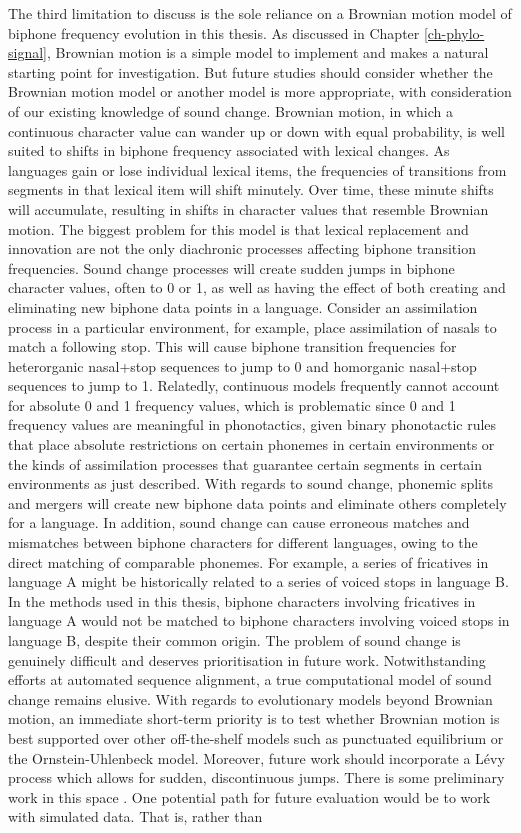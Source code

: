 The third limitation to discuss is the sole reliance on a Brownian motion model of biphone frequency evolution in this thesis. As discussed in Chapter \ref{ch-phylo-signal}, Brownian motion is a simple model to implement and makes a natural starting point for investigation. But future studies should consider whether the Brownian motion model or another model is more appropriate, with consideration of our existing knowledge of sound change. Brownian motion, in which a continuous character value can wander up or down with equal probability, is well suited to shifts in biphone frequency associated with lexical changes. As languages gain or lose individual lexical items, the frequencies of transitions from segments in that lexical item will shift minutely. Over time, these minute shifts will accumulate, resulting in shifts in character values that resemble Brownian motion. The biggest problem for this model is that lexical replacement and innovation are not the only diachronic processes affecting biphone transition frequencies. Sound change processes will create sudden jumps in biphone character values, often to 0 or 1, as well as having the effect of both creating and eliminating new biphone data points in a language. Consider an assimilation process in a particular environment, for example, place assimilation of nasals to match a following stop. This will cause biphone transition frequencies for heterorganic nasal+stop sequences to jump to 0 and homorganic nasal+stop sequences to jump to 1. Relatedly, continuous models frequently cannot account for absolute 0 and 1 frequency values, which is problematic since 0 and 1 frequency values are meaningful in phonotactics, given binary phonotactic rules that place absolute restrictions on certain phonemes in certain environments or the kinds of assimilation processes that guarantee certain segments in certain environments as just described. With regards to sound change, phonemic splits and mergers will create new biphone data points and eliminate others completely for a language. In addition, sound change can cause erroneous matches and mismatches between biphone characters for different languages, owing to the direct matching of comparable phonemes. For example, a series of fricatives in language A might be historically related to a series of voiced stops in language B. In the methods used in this thesis, biphone characters involving fricatives in language A would not be matched to biphone characters involving voiced stops in language B, despite their common origin. The problem of sound change is genuinely difficult and deserves prioritisation in future work. Notwithstanding efforts at automated sequence alignment, a true computational model of sound change remains elusive. With regards to evolutionary models beyond Brownian motion, an immediate short-term priority is to test whether Brownian motion is best supported over other off-the-shelf models such as punctuated equilibrium or the Ornstein-Uhlenbeck model. Moreover, future work should incorporate a Lévy process which allows for sudden, discontinuous jumps. There is some preliminary work in this space \autocites{landis_phylogenetic_2012}{landis_pulsed_2017}{blomberg_beyond_2020}. One potential path for future evaluation would be to work with simulated data. That is, rather than 